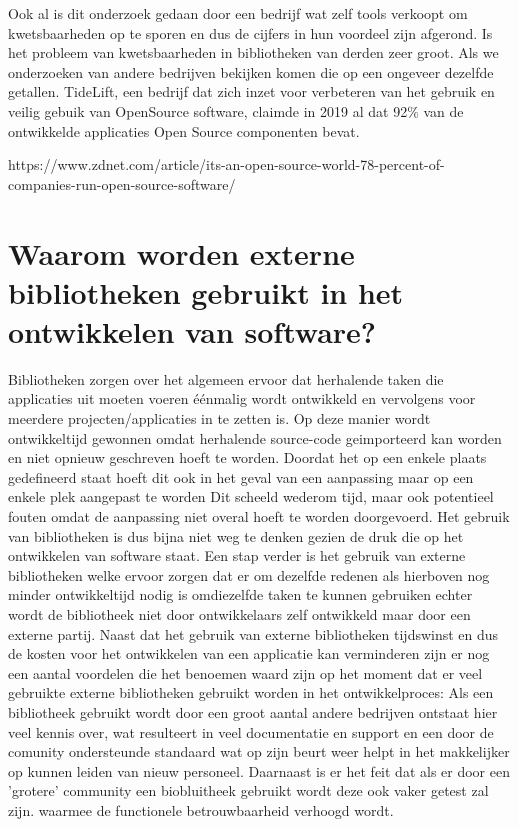 Ook al is dit onderzoek gedaan door een bedrijf wat zelf tools verkoopt om kwetsbaarheden op te sporen en dus de cijfers in hun voordeel zijn afgerond. Is het probleem van kwetsbaarheden in bibliotheken van derden zeer groot. Als we onderzoeken van andere bedrijven bekijken komen die op een ongeveer dezelfde getallen. TideLift, een bedrijf dat zich inzet voor verbeteren van het gebruik en veilig gebuik van OpenSource software,  claimde in 2019 al dat 92\% van de ontwikkelde applicaties Open Source componenten bevat.

https://www.zdnet.com/article/its-an-open-source-world-78-percent-of-companies-run-open-source-software/



\section{Waarom worden externe bibliotheken gebruikt in het ontwikkelen van software?}
Bibliotheken zorgen over het algemeen ervoor dat herhalende taken die applicaties uit moeten voeren éénmalig wordt ontwikkeld en vervolgens voor meerdere projecten/applicaties in te zetten is. Op deze manier wordt ontwikkeltijd gewonnen omdat herhalende source-code geimporteerd kan worden en niet opnieuw geschreven hoeft te worden. Doordat het op een enkele plaats gedefineerd staat hoeft dit ook in het geval van een aanpassing maar op een enkele plek aangepast te worden Dit scheeld wederom tijd, maar ook potentieel fouten omdat de aanpassing niet overal hoeft te worden doorgevoerd. Het gebruik van bibliotheken is dus bijna niet weg te denken gezien de druk die op het ontwikkelen van software staat. Een stap verder is het gebruik van externe bibliotheken welke ervoor zorgen dat er om dezelfde redenen als hierboven nog minder ontwikkeltijd nodig is omdiezelfde taken te kunnen gebruiken echter wordt de bibliotheek niet door ontwikkelaars zelf ontwikkeld maar door een externe partij. Naast dat het gebruik van externe bibliotheken tijdswinst en dus de kosten voor het ontwikkelen van een applicatie kan verminderen zijn er nog een aantal voordelen die het benoemen waard zijn op het moment dat er veel gebruikte externe bibliotheken gebruikt worden in het ontwikkelproces: Als een bibliotheek gebruikt wordt door een groot aantal andere bedrijven ontstaat hier veel kennis over, wat resulteert in veel documentatie en support en een door de comunity ondersteunde standaard wat op zijn beurt weer helpt in het makkelijker op kunnen leiden van nieuw personeel. Daarnaast is er het feit dat als er door een 'grotere' community een biobluitheek gebruikt wordt deze ook vaker getest zal zijn. waarmee de functionele betrouwbaarheid verhoogd wordt.




